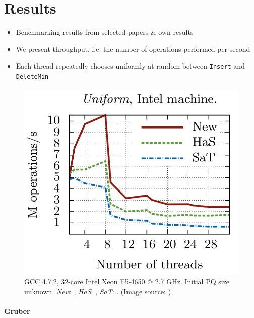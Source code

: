 \documentclass[usenames,dvipsnames]{beamer}
\begin{document}
\section{Results} \label{sec:Results}

\begin{frame}{}

\begin{itemize}
\item Benchmarking results from selected papers \& own results
\item We present throughput, i.e. the number of operations performed per second
\item Each thread repeatedly chooses uniformly at random between
      \lstinline|Insert| and \lstinline|DeleteMin|
\end{itemize}
\end{frame}

\begin{frame}{}
\framesubtitle{\citeauthor{linden2013skiplist}}

\begin{figure}
\includegraphics[width=0.6 \textwidth]{results_linden}
\caption{GCC 4.7.2, 32-core Intel Xeon E5-4650 @ 2.7 GHz. Initial \ac{PQ} size unknown.
\emph{New}: \citeauthor{linden2013skiplist},
\emph{HaS}: \citeauthor{shavit2000skiplist},
\emph{SaT}: \citeauthor{sundell2003fast}. 
(Image source: \cite{linden2013skiplist})}
\end{figure}
\end{frame}

\begin{frame}{}
\framesubtitle{Gruber}
\end{frame}
\end{document}
